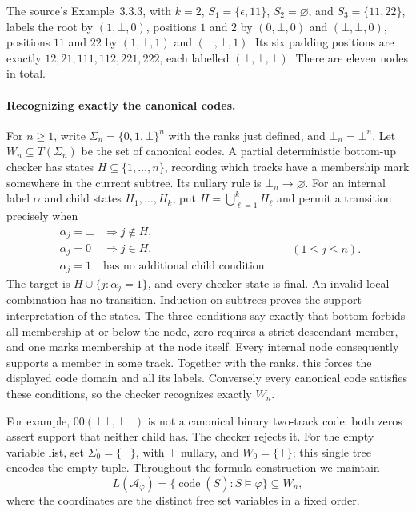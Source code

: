 The source's Example~3.3.3, with
\(k=2\), \(S_1=\{\epsilon,11\}\), \(S_2=\varnothing\), and
\(S_3=\{11,22\}\), labels the root by \((1,\bot,0)\), positions \(1\) and
\(2\) by \((0,\bot,0)\) and \((\bot,\bot,0)\), positions \(11\) and \(22\)
by \((1,\bot,1)\) and \((\bot,\bot,1)\).
Its six padding positions are exactly
\(12,21,111,112,221,222\), each labelled \((\bot,\bot,\bot)\).
There are eleven nodes in total.

\paragraph{Recognizing exactly the canonical codes.}
\label{sec:p09-wsks-canonical}
For \(n\geq1\), write \(\Sigma_n=\{0,1,\bot\}^n\) with the ranks
just defined, and \(\bot_n=\bot^n\).
Let \(W_n\subseteq T(\Sigma_n)\) be the set of canonical codes.
A partial deterministic bottom-up checker has states
\(H\subseteq\{1,\ldots,n\}\), recording which tracks have a
membership mark somewhere in the current subtree.
Its nullary rule is \(\bot_n\to\varnothing\).
For an internal label \(\alpha\) and child states \(H_1,\ldots,H_k\),
put \(H=\bigcup_{\ell=1}^k H_\ell\) and permit a transition precisely when
\[
\begin{array}{ll}
 \alpha_j=\bot&\Longrightarrow j\notin H,\\
 \alpha_j=0&\Longrightarrow j\in H,\\
 \alpha_j=1&\text{has no additional child condition}
\end{array}
\qquad(1\leq j\leq n).
\]
The target is \(H\cup\{j:\alpha_j=1\}\), and every checker state
is final.  An invalid local combination has no transition.
Induction on subtrees proves the support interpretation of the states.
The three conditions say exactly that bottom forbids all membership
at or below the node, zero requires a strict descendant member,
and one marks membership at the node itself.
Every internal node consequently supports a member in some track.
Together with the ranks, this forces the displayed code domain
and all its labels.  Conversely every canonical code satisfies these
conditions, so the checker recognizes exactly \(W_n\).

For example, \(00(\bot\bot,\bot\bot)\) is not a canonical binary
two-track code: both zeros assert support that neither child has.
The checker rejects it.
For the empty variable list, set
\(\Sigma_0=\{\top\}\), with \(\top\) nullary, and \(W_0=\{\top\}\);
this single tree encodes the empty tuple.
Throughout the formula construction we maintain
\[
 L(\mathcal A_\varphi)
   =\{\operatorname{code}(\bar S):\bar S\models\varphi\}
   \subseteq W_n,
\]
where the coordinates are the distinct free set variables in a fixed order.

